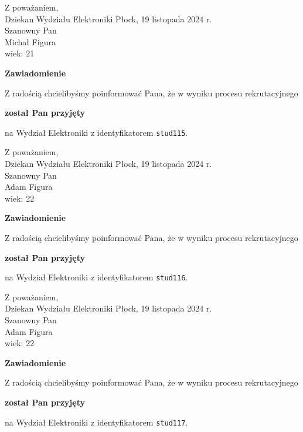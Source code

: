 \documentclass[12pt,a4paper]{article}
\begin{document}
\noindent
Z poważaniem,\\
Dziekan
Wydziału Elektroniki
\newpage
\hfill Płock, 19 listopada 2024 r.\\ 
\noindent 
Szanowny Pan \\
Michał Figura \\
wiek: 21

\bigskip

\begin{center}
{\Large\textbf{Zawiadomienie}}
\end{center}
\bigskip
Z radością chcielibyśmy poinformować Pana, że w wyniku procesu rekrutacyjnego
\begin{center}
\textsf{\textbf{został Pan przyjęty}} 
\end{center}
na Wydział Elektroniki z identyfikatorem \verb|stud115|.
\vspace{2cm}

\noindent
Z poważaniem,\\
Dziekan
Wydziału Elektroniki
\newpage
\hfill Płock, 19 listopada 2024 r.\\ 
\noindent 
Szanowny Pan \\
Adam Figura \\
wiek: 22

\bigskip

\begin{center}
{\Large\textbf{Zawiadomienie}}
\end{center}
\bigskip
Z radością chcielibyśmy poinformować Pana, że w wyniku procesu rekrutacyjnego
\begin{center}
\textsf{\textbf{został Pan przyjęty}} 
\end{center}
na Wydział Elektroniki z identyfikatorem \verb|stud116|.
\vspace{2cm}

\noindent
Z poważaniem,\\
Dziekan
Wydziału Elektroniki
\newpage
\hfill Płock, 19 listopada 2024 r.\\ 
\noindent 
Szanowny Pan \\
Adam Figura \\
wiek: 22

\bigskip

\begin{center}
{\Large\textbf{Zawiadomienie}}
\end{center}
\bigskip
Z radością chcielibyśmy poinformować Pana, że w wyniku procesu rekrutacyjnego
\begin{center}
\textsf{\textbf{został Pan przyjęty}} 
\end{center}
na Wydział Elektroniki z identyfikatorem \verb|stud117|.
\vspace{2cm}
\end{document}
